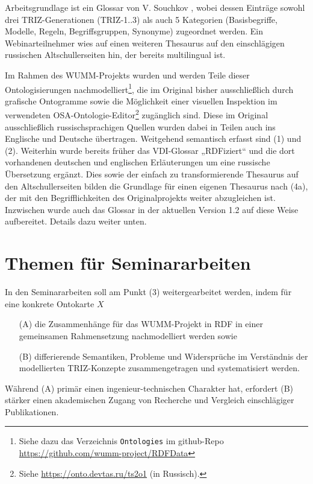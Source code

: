 \documentclass[11pt,a4paper]{article}
\begin{document}
Arbeitsgrundlage ist ein Glossar von V. Souchkov \cite{SG}, wobei dessen
Einträge sowohl drei TRIZ-Generationen (TRIZ-1..3) als auch 5 Kategorien
(Basisbegriffe, Modelle, Regeln, Begriffsgruppen, Synonyme) zugeordnet
werden. Ein Webinarteilnehmer wies auf einen weiteren Thesaurus \cite{GSA} auf
den einschlägigen russischen Altschullerseiten hin, der bereits multilingual
ist.

Im Rahmen des WUMM-Projekts wurden und werden Teile dieser Ontologisierungen
nachmodelliert\footnote{Siehe dazu das Verzeichnis \texttt{Ontologies} im
  github-Repo \url{https://github.com/wumm-project/RDFData}}, die im Original
bisher ausschließlich durch grafische Ontogramme sowie die Möglichkeit einer
visuellen Inspektion im verwendeten OSA-Ontologie-Editor\footnote{Siehe
  \url{https://onto.devtas.ru/ts2o1} (in Russisch).} zugänglich sind.  Diese
im Original ausschließlich russischsprachigen Quellen wurden dabei in Teilen
auch ins Englische und Deutsche übertragen.  Weitgehend semantisch erfasst
sind (1) und (2). Weiterhin wurde bereits früher das VDI-Glossar „RDFiziert“
und die dort vorhandenen deutschen und englischen Erläuterungen um eine
russische Übersetzung ergänzt. Dies sowie der einfach zu transformierende
Thesaurus auf den Altschullerseiten bilden die Grundlage für einen eigenen
Thesaurus nach (4a), der mit den Begriff\-lichkeiten des Originalprojekts
weiter abzugleichen ist.  Inzwischen wurde auch das Glossar \cite{SG} in der
aktuellen Version 1.2 auf diese Weise aufbereitet.  Details dazu weiter unten.

\section{Themen für Seminararbeiten}

In den Seminararbeiten soll am Punkt (3) weitergearbeitet werden, indem für
eine konkrete Ontokarte $X$ 
\begin{itemize}[noitemsep]
\item[(A)] die Zusammenhänge für das WUMM-Projekt in RDF in einer gemeinsamen
  Rahmensetzung nachmodelliert werden sowie
\item[(B)] differierende Semantiken, Probleme und Widersprüche im Verständnis
  der modellierten TRIZ-Konzepte zusammengetragen und systematisiert werden.  
\end{itemize}
Während (A) primär einen ingenieur-technischen Charakter hat, erfordert (B)
stärker einen akademischen Zugang von Recherche und Vergleich einschlägiger
Publikationen.
\end{document}
